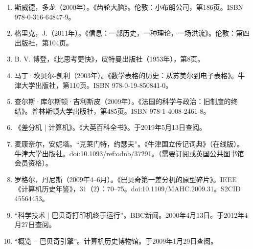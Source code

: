 \begin{enumerate}
\item 斯威德，多龙（2000年）。《齿轮大脑》。伦敦：小布朗公司，第186页。ISBN 978-0-316-64847-9。
\item 格里克，J.（2011年）。《信息：一部历史，一种理论，一场洪流》。伦敦：第四出版社，第104页。
\item B. V. 博登，《比思考更快》，皮特曼出版社（1953年），第8页。
\item 马丁·坎贝尔-凯利（2003年）。《数学表格的历史：从苏美尔到电子表格》。牛津大学出版社，第110页。ISBN 978-0-19-850841-0。
\item 查尔斯·库尔斯顿·吉利斯皮（2009年）。《法国的科学与政治：旧制度的终结》。普林斯顿大学出版社，第485页。ISBN 978-1-4008-2461-8。
\item 《差分机 | 计算机》。《大英百科全书》。于2019年5月13日查阅。
\item 麦康奈尔，安妮塔。“克莱门特，约瑟夫”。《牛津国立传记词典》（在线版）。牛津大学出版社。doi:10.1093/ref:odnb/37291。（需要订阅或英国公共图书馆会员资格）。
\item 罗格尔，丹尼斯（2009年4–6月）。《巴贝奇第一差分机的原型碎片》。IEEE《计算机历史年鉴》，31（2）：70–75。doi:10.1109/MAHC.2009.31。S2CID 45564453。
\item “科学技术 | 巴贝奇打印机终于运行”。BBC新闻。2000年4月13日。于2012年4月27日查阅。
\item “概览 – 巴贝奇引擎”。计算机历史博物馆。于2009年1月29日查阅。
\end{enumerate}